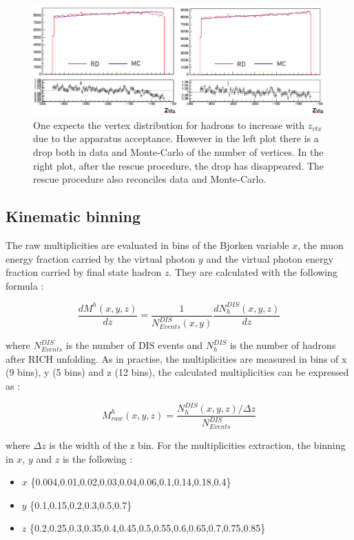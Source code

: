 \documentclass[letterpaper,12pt]{article}
\begin{document}
\begin{figure}[!h]
	\includegraphics[scale=0.45]{./gfx/VertexDrop.png}
	\caption{One expects the vertex distribution for hadrons to increase with $z_{vtx}$ due to the apparatus acceptance. However in the left plot there is a drop both in data and Monte-Carlo of the number of vertices. In the right plot, after the rescue procedure, the drop has disappeared. The rescue procedure also reconciles data and Monte-Carlo.}
	\label{VertexDrop}
\end{figure}

\subsection{Kinematic binning}

The raw multiplicities are evaluated in bins of the Bjorken variable $x$, the muon energy fraction carried
by the virtual photon $y$ and the virtual photon energy fraction carried by final state hadron $z$. They
are calculated with the following formula :

\begin{equation}
  \frac{dM^h(x,y,z)}{dz}=\frac{1}{N^{DIS}_{Events}(x,y)}\frac{dN^{DIS}_{h}(x,y,z)}{dz}
\end{equation}

where $N^{DIS}_{Events}$ is the number of DIS events and $N^{DIS}_{h}$ is the number of
hadrons after RICH unfolding. As in practise, the multiplicities are measured in bins of
x (9 bins), y (5 bins) and z (12 bins), the calculated multiplicities can be expressed as :

\begin{equation}
  M^h_{raw}(x,y,z) = \frac{N^{DIS}_{h}(x,y,z)/\Delta z}{N^{DIS}_{Events}}
\end{equation}

where $\Delta z$ is the width of the z bin. For the multiplicities extraction, the binning in
$x$, $y$ and $z$ is the following :

\begin{itemize}
  \item $x$ \{0.004,0.01,0.02,0.03,0.04,0.06,0.1,0.14,0.18,0.4\}
  \item $y$ \{0.1,0.15,0.2,0.3,0.5,0.7\}
  \item $z$ \{0.2,0.25,0.3,0.35,0.4,0.45,0.5,0.55,0.6,0.65,0.7,0.75,0.85\}
\end{itemize}
\end{document}
